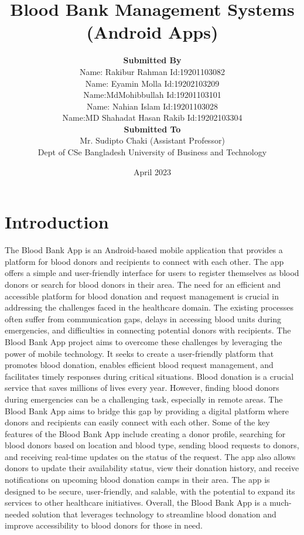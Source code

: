 \documentclass{article}
\title {\textbf{ Blood Bank Management Systems (Android Apps)}}
\author 
{\textbf{Submitted By}\\ Name: Rakibur Rahman Id:19201103082\\ Name: Eyamin Molla Id:19202103209\\ Name:MdMohibbullah Id:19201103101\\ Name: Nahian Islam Id:19201103028\\ Name:MD Shahadat Hasan Rakib Id:19202103304\\
\textbf{Submitted To}\\ Mr. Sudipto Chaki (Assistant Professor)\\
Dept of CSe
Bangladesh University of Business and
Technology 
}
\date{April 2023}
\begin{document}
\maketitle
\newpage
\tableofcontents
\newpage
\section{Introduction}
The Blood Bank App is an Android-based mobile application that provides a platform for blood
donors and recipients to connect with each other. The app offers a simple and user-friendly
interface for users to register themselves as blood donors or search for blood donors in their
area. The need for an efficient and accessible platform for blood donation and request
management is crucial in addressing the challenges faced in the healthcare domain. The existing
processes often suffer from communication gaps, delays in accessing blood units during
emergencies, and difficulties in connecting potential donors with recipients. The Blood Bank App
project aims to overcome these challenges by leveraging the power of mobile technology. It seeks
to create a user-friendly platform that promotes blood donation, enables efficient blood request
management, and facilitates timely responses during critical situations. Blood donation is a
crucial service that saves millions of lives every year. However, finding blood donors during
emergencies can be a challenging task, especially in remote areas. The Blood Bank App aims to
bridge this gap by providing a digital platform where donors and recipients can easily connect
with each other. Some of the key features of the Blood Bank App include creating a donor profile,
searching for blood donors based on location and blood type, sending blood requests to donors,
and receiving real-time updates on the status of the request. The app also allows donors to
update their availability status, view their donation history, and receive notifications on
upcoming blood donation camps in their area. The app is designed to be secure, user-friendly,
and salable, with the potential to expand its services to other healthcare initiatives. Overall, the
Blood Bank App is a much-needed solution that leverages technology to streamline blood
donation and improve accessibility to blood donors for those in need.
\end{document}
